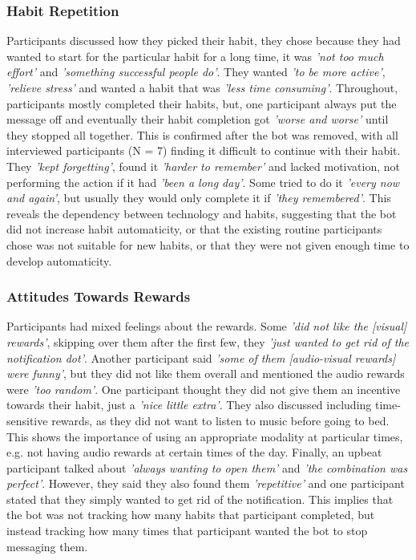 \documentclass{scaffold/sigchi}
\begin{document}
\subsubsection{Habit Repetition}
Participants discussed how they picked their habit, they chose because they had wanted to start for the particular habit for a long time, it was \textit{'not too much effort'} and \textit{'something successful people do'}. They wanted \textit{'to be more active'}, \textit{'relieve stress'} and wanted a habit that was \textit{'less time consuming'}. Throughout, participants mostly completed their habits, but, one participant always put the message off and eventually their habit completion got \textit{'worse and worse'} until they stopped all together. This is confirmed after the bot was removed, with all interviewed participants (N = 7) finding it difficult to continue with their habit. They \textit{'kept forgetting'}, found it \textit{'harder to remember'} and lacked motivation, not performing the action if it had \textit{'been a long day'}. Some tried to do it \textit{'every now and again'}, but usually they would only complete it if \textit{'they remembered'}. This reveals the dependency between technology and habits, suggesting that the bot did not increase habit automaticity, or that the existing routine participants chose was not suitable for new habits, or that they were not given enough time to develop automaticity.

\subsubsection{Attitudes Towards Rewards}
Participants had mixed feelings about the rewards. Some \textit{'did not like the [visual] rewards'}, skipping over them after the first few, they \textit{'just wanted to get rid of the notification dot'}. Another participant said \textit{'some of them [audio-visual rewards] were funny'}, but they did not like them overall and mentioned the audio rewards were \textit{'too random'}. One participant thought they did not give them an incentive towards their habit, just a \textit{'nice little extra'}. They also discussed including time-sensitive rewards, as they did not want to listen to music before going to bed. This shows the importance of using an appropriate modality at particular times, e.g. not having audio rewards at certain times of the day. Finally, an upbeat participant talked about \textit{'always wanting to open them'} and \textit{'the combination was perfect'}. However, they said they also found them \textit{'repetitive'} and one participant stated that they simply wanted to get rid of the notification. This implies that the bot was not tracking how many habits that participant completed, but instead tracking how many times that participant wanted the bot to stop messaging them.
\end{document}
